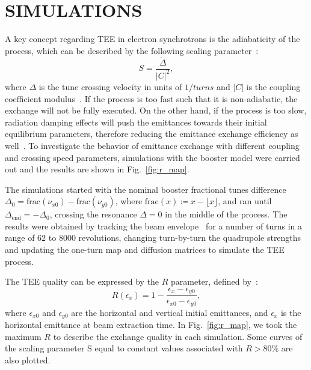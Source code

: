 \documentclass[a4paper,
               keeplastbox,   %
              nospread,     %
               ]{jacow}
\begin{document}
\section{SIMULATIONS}

A key concept regarding TEE in electron synchrotrons is the adiabaticity of the process, which can be described by the following scaling parameter~\cite{Kallestrup2020, Aiba2020}:   
\begin{equation}
S = \frac{\dot{\Delta}}{|C|^2},
\end{equation}
where $\dot{\Delta}$ is the tune crossing velocity in units of $\unit{1/turns}$ and $|C|$ is the coupling coefficient modulus~\cite{Guignard1995}. If the process is too fast such that it is non-adiabatic, the exchange will not be fully executed.
On the other hand, if the process is too slow, radiation damping effects will push the emittances towards their initial equilibrium parameters, therefore reducing the emittance exchange efficiency as well~\cite{Kallestrup2020, Capoani:IPAC21-TUPAB232}. To investigate the behavior of emittance exchange with different coupling and crossing speed parameters, simulations with the booster model were carried out and the results are shown in Fig.~\ref{fig:r_map}.

The simulations started with the nominal booster fractional tunes difference $\Delta_0=\mathrm{frac}(\nu_{x0}) - \mathrm{frac}(\nu_{y0})$, where $\mathrm{frac}(x) \coloneqq x - \lfloor x \rfloor$, and ran until $\Delta_\mathrm{end} = -\Delta_0$, crossing the resonance $\Delta=0$ in the middle of the process. The results were obtained by tracking the beam envelope~\cite{Ohmi1994} for a number of turns in a range of $62$ to $8000$ revolutions, changing turn-by-turn the quadrupole strengths and updating the one-turn map and diffusion matrices to simulate the TEE process.

The TEE quality can be expressed by the $R$ parameter, defined by~\cite{Kallestrup2020}:
\begin{equation}
    R(\epsilon_x) = 1 - \frac{\epsilon_x - \epsilon_{y0}}{\epsilon_{x0} - \epsilon_{y0}},
    \label{eq:r_def}
\end{equation}
where $\epsilon_{x0}$ and $\epsilon_{y0}$ are the horizontal and vertical initial emittances, and $\epsilon_x$ is the horizontal emittance at beam extraction time. In Fig.~\ref{fig:r_map}, we took the maximum $R$ to describe the exchange quality in each simulation. Some curves of the scaling parameter S equal to constant values associated with $R>80\%$ are also plotted.
\end{document}
